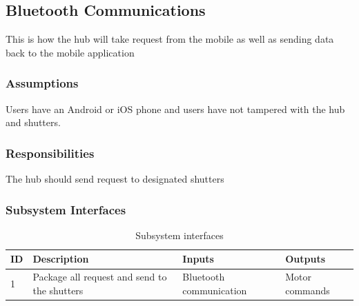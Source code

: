 \subsection{Bluetooth Communications}
This is how the hub will take request from the mobile as well as sending data back to the mobile application

\subsubsection{Assumptions}
Users have an Android or iOS phone and users have not tampered with the hub and shutters.

\subsubsection{Responsibilities}
The hub should send request to designated shutters 

\subsubsection{Subsystem Interfaces}
\begin {table}[H]
\caption {Subsystem interfaces} 
\begin{center}
    \begin{tabular}{ | p{1cm} | p{7cm} | p{5cm} | p{3cm} |}
    \hline
    ID & Description & Inputs & Outputs \\ \hline
    1 &Package all request and send to the shutters& Bluetooth communication&Motor commands \\ \hline
    \end{tabular}
\end{center}
\end{table}